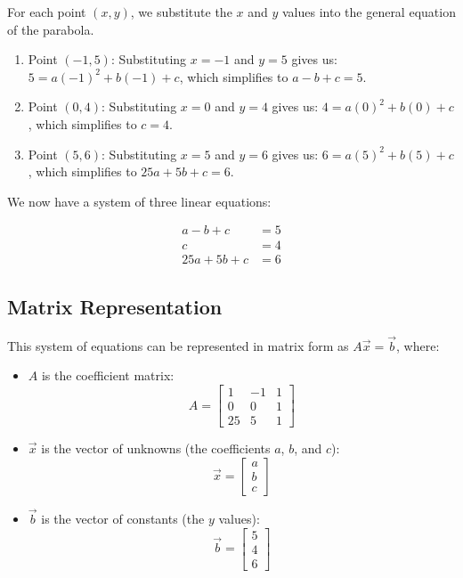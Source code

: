 \documentclass{report}
\begin{document}
For each point $(x, y)$, we substitute the $x$ and $y$ values into the general equation of the parabola.

\begin{enumerate}
	\item Point $(-1, 5)$:  Substituting $x = -1$ and $y = 5$ gives us:
	      $5 = a(-1)^2 + b(-1) + c$, which simplifies to $a - b + c = 5$.

	\item Point $(0, 4)$: Substituting $x = 0$ and $y = 4$ gives us:
	      $4 = a(0)^2 + b(0) + c$, which simplifies to $c = 4$.

	\item Point $(5, 6)$: Substituting $x = 5$ and $y = 6$ gives us:
	      $6 = a(5)^2 + b(5) + c$, which simplifies to $25a + 5b + c = 6$.
\end{enumerate}

We now have a system of three linear equations:

\begin{align*}
	a - b + c    & = 5 \\
	c            & = 4 \\
	25a + 5b + c & = 6
\end{align*}

\subsection{Matrix Representation}

This system of equations can be represented in matrix form as $A\vec{x} = \vec{b}$, where:

\begin{itemize}
	\item $A$ is the coefficient matrix:
	      $$A = \begin{bmatrix} 1 & -1 & 1 \\ 0 & 0 & 1 \\ 25 & 5 & 1 \end{bmatrix}$$

	\item $\vec{x}$ is the vector of unknowns (the coefficients $a$, $b$, and $c$):
	      $$\vec{x} = \begin{bmatrix} a \\ b \\ c \end{bmatrix}$$

	\item $\vec{b}$ is the vector of constants (the $y$ values):
	      $$\vec{b} = \begin{bmatrix} 5 \\ 4 \\ 6 \end{bmatrix}$$
\end{itemize}
\end{document}
